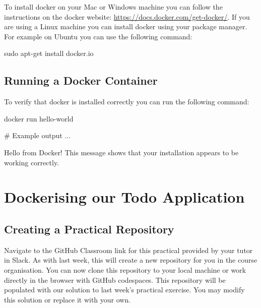 \documentclass{csse4400}
\begin{document}
To install docker on your Mac or Windows machine you can follow the instructions on the docker website: \url{https://docs.docker.com/get-docker/}. If you are using a Linux machine you can install docker using your package manager. For example on Ubuntu you can use the following command:

\begin{code}[language=bash,numbers=none]{}
  sudo apt-get install docker.io
\end{code}



\subsection{Running a Docker Container}

To verify that docker is installed correctly you can run the following command:

\begin{code}[language=bash,numbers=none]{}
  docker run hello-world

  # Example output
  ...

  Hello from Docker!
  This message shows that your installation appears to be working correctly.
\end{code}


\section{Dockerising our Todo Application}


\subsection{Creating a Practical Repository}
Navigate to the GitHub Classroom link for this practical provided by your tutor in Slack.
As with last week, this will create a new repository for you in the course organisation.
You can now clone this repository to your local machine or work directly in the browser with GitHub codespaces.
This repository will be populated with our solution to last week's practical exercise.
You may modify this solution or replace it with your own.
\end{document}
